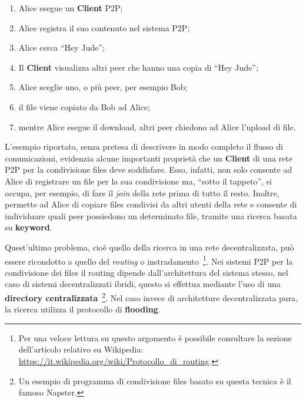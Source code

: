 \begin{enumerate}

 \item Alice esegue un \textbf{Client} P2P;

 \item Alice registra il suo contenuto nel sistema P2P;

 \item Alice cerca ``Hey Jude'';

 \item Il \textbf{Client} visualizza altri peer che hanno una copia di ``Hey
       Jude'';

 \item Alice sceglie uno, o più peer, per esempio Bob;

 \item il file viene copiato da Bob ad Alice;

 \item mentre Alice esegue il download, altri peer chiedono ad Alice l'upload
       di file.

\end{enumerate}

L'esempio riportato, senza pretesa di descrivere in modo completo il flusso di
comunicazioni, evidenzia alcune importanti proprietà che un \textbf{Client} di
una rete P2P per la condivisione files deve soddisfare. Esso, infatti, non solo
consente ad Alice di registrare un file per la sua condivisione ma, ``sotto il
tappeto'', si occupa, per esempio, di fare il \textit{join} della rete prima di
tutto il resto. Inoltre, permette ad Alice di copiare files condivisi da altri
utenti della rete e consente di individuare quali peer possiedono un determinato
file, tramite una ricerca basata su \textbf{keyword}.

Quest'ultimo problema, cioè quello della ricerca in una rete decentralizzata,
può essere ricondotto a quello del \textit{routing} o
instradamento~\footnote{Per una veloce lettura su questo argomento è possibile
 consultare la sezione dell'articolo relativo su Wikipedia:
 \url{https://it.wikipedia.org/wiki/Protocollo_di_routing}.}. Nei sistemi P2P per
la condivisione dei files il routing dipende dall'architettura del sistema
stesso, nel caso di sistemi decentralizzati ibridi, questo si effettua mediante
l'uso di una \textbf{directory centralizzata}~\footnote{Un esempio di programma
 di condivisione files basato su questa tecnica è il famoso Napster.}. Nel caso
invece di architetture decentralizzata pura, la ricerca utilizza il protocollo
di \textbf{flooding}.

